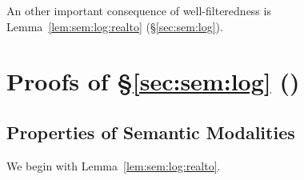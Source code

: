 An other important consequence of well-filteredness is
Lemma~\ref{lem:sem:log:realto} (\S\ref{sec:sem:log}).



\section{Proofs of \S\ref{sec:sem:log} ()}
\label{sec:proof:sem:log}


\subsection{Properties of Semantic Modalities}
\label{sec:proof:sem:log:mod}

We begin with Lemma~\ref{lem:sem:log:realto}.

\LemWfArrow*

